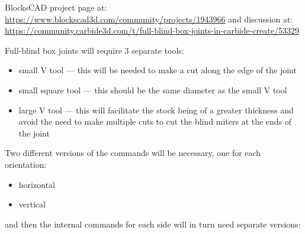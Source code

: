 \documentclass{ltxdoc}
\begin{document}
BlocksCAD project page at: \url{https://www.blockscad3d.com/community/projects/1943966} and discussion at: \url{https://community.carbide3d.com/t/full-blind-box-joints-in-carbide-create/53329}

Full-blind box joints will require 3 separate tools:

\begin{itemize}
\item small V tool --- this will be needed to make a cut along the edge of the joint
\item small square tool --- this should be the same diameter as the small V tool
\item large V tool --- this will facilitate the stock being of a greater thickness and avoid the need to make multiple cuts to cut the blind miters at the ends of the joint
\end{itemize}

Two different versions of the commands will be necessary, one for each orientation:

\begin{itemize}
\item horizontal
\item vertical
\end{itemize}

\noindent and then the internal commands for each side will in turn need separate versions:
\end{document}
